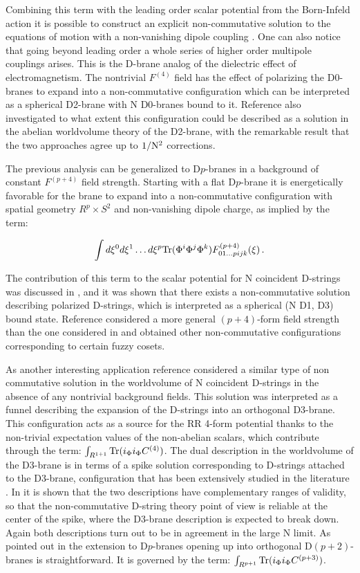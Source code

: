 \documentclass[12pt,a4paper]{article}
\begin{document}
\noindent Combining this term with the leading order
scalar potential from the Born-Infeld action it is possible to construct
an explicit
non-commutative solution to the equations of motion with a non-vanishing
dipole coupling \cite{Myers}. One can also notice that going beyond 
leading order a whole series
of higher order multipole couplings arises.
This is the D-brane analog of the dielectric effect of
electromagnetism. The nontrivial $F^{(4)}$ field has the effect of polarizing
the D0-branes to expand into a non-commutative configuration which can be
interpreted as a spherical D2-brane with N D0-branes bound to it.
Reference \cite{Myers} also investigated to what extent 
this configuration could be described as a solution
in the abelian worldvolume theory of the D2-brane, with the remarkable result 
that the two approaches
agree up to $1/{\rm N}^2$ corrections.

The previous analysis can be generalized to D$p$-branes in a
background of constant $F^{(p+4)}$ field strength. 
Starting with a flat D$p$-brane
it is energetically favorable for the brane to expand into a 
non-commutative configuration with spatial geometry $R^p \times S^2$ and
non-vanishing dipole charge, as implied by the term:

\begin{equation}
\int d{\xi}^0 d{\xi}^1\dots d{\xi}^p {\rm Tr}(\Phi^i \Phi^j \Phi^k)
F^{(p+4)}_{01\dots p ijk}(\xi)\, .
\end{equation}

\noindent The contribution of this term to the scalar
potential for N coincident D-strings was discussed in \cite{CMT},
and it was shown that there exists a
non-commutative solution describing polarized D-strings, which is interpreted
as a spherical (N D1, D3) bound state. 
Reference \cite{TV} considered a more general $(p+4)$-form field
strength than the one considered in \cite{Myers} and obtained other
non-commutative configurations corresponding to certain fuzzy cosets.

As another interesting application reference
\cite{CMT} considered a similar type of non commutative solution 
in the worldvolume of N coincident D-strings in the absence of any nontrivial
background fields. This solution was interpreted as a funnel
describing the expansion of the D-strings into an orthogonal D3-brane.
This configuration  
acts as a source for the RR 4-form potential thanks to the
non-trivial expectation values of the non-abelian scalars, which
contribute through the term:
$\int_{R^{1+1}}{\rm Tr}(i_\Phi i_\Phi C^{(4)})$.
The dual description in the worldvolume of the 
D3-brane is in terms of a spike
solution corresponding to D-strings attached to
the D3-brane, configuration that has been extensively studied in 
the literature \cite{CM}. In
\cite{CMT} it is shown that the two descriptions have complementary 
ranges of validity, 
so that the non-commutative D-string theory point of view
is reliable at the center of the
spike, where the D3-brane description is expected to break down. Again both
descriptions turn out to be in agreement in the large N limit. 
As pointed out in \cite{CMT} the extension to D$p$-branes opening up
into orthogonal D$(p+2)$-branes is straightforward. It is
governed by the term:
$\int_{R^{p+1}}{\rm Tr}(i_\Phi i_\Phi C^{(p+3)})$.
\end{document}
